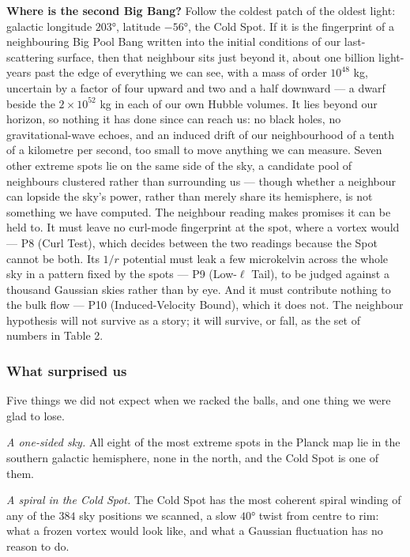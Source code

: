 \documentclass[
]{article}
\begin{document}
\textbf{Where is the second Big Bang?} Follow the coldest patch of the
oldest light: galactic longitude \(203°\), latitude \(-56°\), the Cold
Spot. If it is the fingerprint of a neighbouring Big Pool Bang written
into the initial conditions of our last-scattering surface, then that
neighbour sits just beyond it, about one billion light-years past the
edge of everything we can see, with a mass of order \(10^{48}\) kg,
uncertain by a factor of four upward and two and a half downward --- a
dwarf beside the \(2\times10^{52}\) kg in each of our own Hubble
volumes. It lies beyond our horizon, so nothing it has done since can
reach us: no black holes, no gravitational-wave echoes, and an induced
drift of our neighbourhood of a tenth of a kilometre per second, too
small to move anything we can measure. Seven other extreme spots lie on
the same side of the sky, a candidate pool of neighbours clustered
rather than surrounding us --- though whether a neighbour can lopside
the sky's power, rather than merely share its hemisphere, is not
something we have computed. The neighbour reading makes promises it can
be held to. It must leave no curl-mode fingerprint at the spot, where a
vortex would --- P8 (Curl Test), which decides between the two readings
because the Spot cannot be both. Its \(1/r\) potential must leak a few
microkelvin across the whole sky in a pattern fixed by the spots --- P9
(Low-\(\ell\) Tail), to be judged against a thousand Gaussian skies
rather than by eye. And it must contribute nothing to the bulk flow ---
P10 (Induced-Velocity Bound), which it does not. The neighbour
hypothesis will not survive as a story; it will survive, or fall, as the
set of numbers in Table 2.

\hypertarget{what-surprised-us}{%
\subsubsection{What surprised us}\label{what-surprised-us}}

Five things we did not expect when we racked the balls, and one thing we
were glad to lose.

\emph{A one-sided sky.} All eight of the most extreme spots in the
Planck map lie in the southern galactic hemisphere, none in the north,
and the Cold Spot is one of them.

\emph{A spiral in the Cold Spot.} The Cold Spot has the most coherent
spiral winding of any of the \(384\) sky positions we scanned, a slow
\(40°\) twist from centre to rim: what a frozen vortex would look like,
and what a Gaussian fluctuation has no reason to do.
\end{document}
